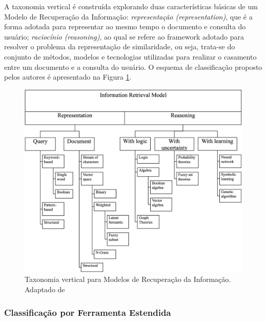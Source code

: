 

A taxonomia vertical é construída explorando duas características básicas de um Modelo de
Recuperação da Informação: \textit{representação (representation)}, que é a forma adotada para representar ao mesmo
tempo o documento e consulta do usuário; \textit{raciocínio (reasoning)}, ao qual se refere ao framework adotado
para resolver o problema da representação de similaridade, ou seja, trata-se do conjunto de métodos, modelos e tecnologias utilizadas para realizar o casamento entre um documento e a consulta do usuário. O esquema de classificação proposto pelos autores é apresentado na Figura \ref{fig:information-retrieval-model}.

\begin{figure}[htpb]
	\centering
	\includegraphics[width=0.8\linewidth]{./chapter-mapeamento-sistematico/img/information-retrieval-model.png}
	\caption{Taxonomia vertical para Modelos de Recuperação da Informação. Adaptado de \cite{cerulo2004taxonomy}}
	\label{fig:information-retrieval-model}
\end{figure}

\subsubsection{Classificação por Ferramenta Estendida}
\label{subsubsec:map-esquema-ferramenta}

